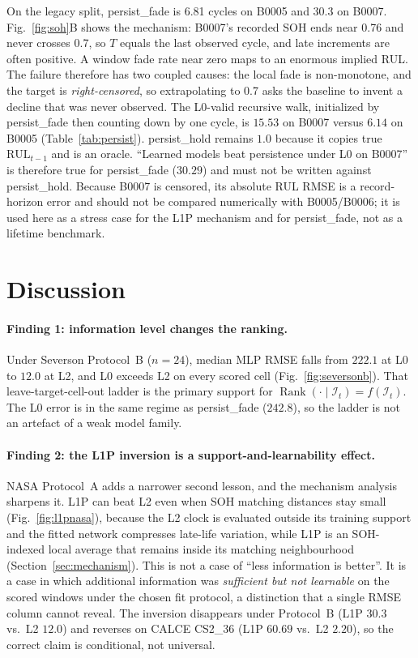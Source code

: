 On the legacy split, persist\_fade is 6.81 cycles on B0005 and 30.3 on B0007.
Fig.~\ref{fig:soh}B shows the mechanism: B0007's recorded SOH ends near 0.76 and never crosses 0.7, so $T$ equals the last observed cycle, and late increments are often positive.
A window fade rate near zero maps to an enormous implied RUL.
The failure therefore has two coupled causes: the local fade is non-monotone, and the target is \emph{right-censored}, so extrapolating to 0.7 asks the baseline to invent a decline that was never observed.
The L0-valid recursive walk, initialized by persist\_fade then counting down by one cycle, is $15.53$ on B0007 versus $6.14$ on B0005 (Table~\ref{tab:persist}).
persist\_hold remains $1.0$ because it copies true $\mathrm{RUL}_{t-1}$ and is an oracle.
“Learned models beat persistence under L0 on B0007” is therefore true for persist\_fade ($30.29$) and must not be written against persist\_hold.
Because B0007 is censored, its absolute RUL RMSE is a record-horizon error and should not be compared numerically with B0005/B0006; it is used here as a stress case for the L1P mechanism and for persist\_fade, not as a lifetime benchmark.

\section{Discussion}
\label{sec:discussion}

\paragraph{Finding 1: information level changes the ranking.}
Under Severson Protocol~B ($n{=}24$), median MLP RMSE falls from $222.1$ at L0 to $12.0$ at L2, and L0 exceeds L2 on every scored cell (Fig.~\ref{fig:seversonb}).
That leave-target-cell-out ladder is the primary support for $\operatorname{Rank}(\cdot\mid\mathcal{I}_t)=f(\mathcal{I}_t)$.
The L0 error is in the same regime as persist\_fade ($242.8$), so the ladder is not an artefact of a weak model family.

\paragraph{Finding 2: the L1P inversion is a support-and-learnability effect.}
NASA Protocol~A adds a narrower second lesson, and the mechanism analysis sharpens it.
L1P can beat L2 even when SOH matching distances stay small (Fig.~\ref{fig:l1pnasa}), because the L2 clock is evaluated outside its training support and the fitted network compresses late-life variation, while L1P is an SOH-indexed local average that remains inside its matching neighbourhood (Section~\ref{sec:mechanism}).
This is not a case of “less information is better”.
It is a case in which additional information was \emph{sufficient but not learnable} on the scored windows under the chosen fit protocol, a distinction that a single RMSE column cannot reveal.
The inversion disappears under Protocol~B (L1P $30.3$ vs.\ L2 $12.0$) and reverses on CALCE CS2\_36 (L1P $60.69$ vs.\ L2 $2.20$), so the correct claim is conditional, not universal.


